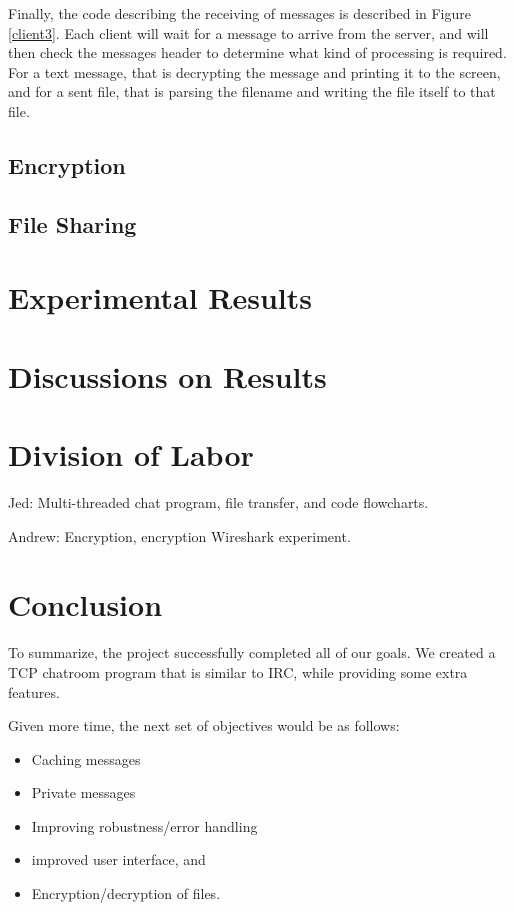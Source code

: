 \documentclass{article}
\begin{document}
Finally, the code describing the receiving of messages is described in Figure \ref{client3}. Each client will wait for a message to arrive from the server, and will then check the messages header to determine what kind of processing is required. For a text message, that is decrypting the message and printing it to the screen, and for a sent file, that is parsing the filename and writing the file itself to that file.

\subsection{Encryption}


\subsection{File Sharing}


\section{Experimental Results}

\section{Discussions on Results}

\section{Division of Labor}

Jed: Multi-threaded chat program, file transfer, and code flowcharts. 

Andrew: Encryption, encryption Wireshark experiment. 

\section{Conclusion}

To summarize, the project successfully completed all of our goals. We created a TCP chatroom program that is similar to IRC, while providing some extra features. 

Given more time, the next set of objectives would be as follows: 
\begin{itemize}
  \item Caching messages
  \item Private messages
  \item Improving robustness/error handling
  \item improved user interface, and
  \item Encryption/decryption of files. 
\end{itemize}
\end{document}
